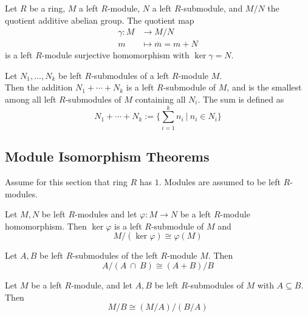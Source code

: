 \begin{proposition}
Let $R$ be a ring, $M$ a left $R$-module, $N$ a left $R$-submodule, and $M/N$ the quotient additive abelian group. The quotient map
\begin{align}
\gamma : M &\rightarrow M/N \nonumber \\
m &\mapsto \overline{m} = m+N \nonumber
\end{align}
is a left $R$-module surjective homomorphism with $\ker \gamma = N$.
\end{proposition}

\begin{remark}
Let $N_1, \ldots, N_k$ be left $R$-submodules of a left $R$-module $M$.\\
Then the addition $N_1 + \cdots + N_k$ is a left $R$-submodule of $M$, and is the smallest among all left $R$-submodules of $M$ containing all $N_i$. The sum is defined as
\begin{equation}
N_1 + \cdots + N_k := \{\sum_{i=1}^k n_i \ | \ n_i \in N_i\} \nonumber
\end{equation}
\end{remark}

\subsection{Module Isomorphism Theorems}

Assume for this section that ring $R$ has $1$. Modules are assumed to be left $R$-modules.

\begin{theorem}
Let $M,N$ be left $R$-modules and let $\varphi: M \rightarrow N$ be a left $R$-module homomorphism. Then $\ker \varphi$ is a left $R$-submodule of $M$ and
\begin{equation}
M/(\ker \varphi) \cong \varphi(M) \nonumber
\end{equation}
\end{theorem}

\begin{theorem}
 Let $A, B$ be left $R$-submodules of the left $R$-module $M$. Then
\begin{equation}
A/(A \ \cap \ B) \cong (A+B) / B \nonumber
\end{equation}
\end{theorem}

\begin{theorem}
 Let $M$ be a left $R$-module, and let $A,B$ be left $R$-submodules of $M$ with $A \subseteq B$. Then
\begin{equation}
M/B \cong (M/A)/(B/A) \nonumber
\end{equation}
\end{theorem}

